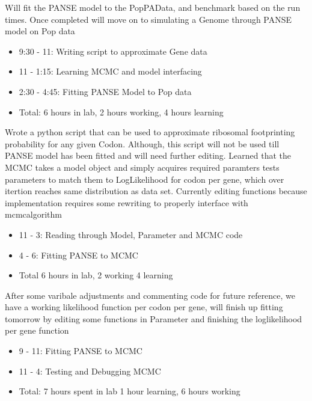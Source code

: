 \documentclass[12pt,hyperref]{labbook}
\begin{document}
Will fit the PANSE model to the PopPAData, and benchmark based on the run times. Once completed will move on to simulating a Genome through PANSE model on Pop data
\begin{itemize}
    \item 9:30 - 11: Writing script to approximate Gene data
    \item 11 - 1:15: Learning MCMC and model interfacing
    \item 2:30 - 4:45: Fitting PANSE Model to Pop data
    \item Total: 6 hours in lab, 2 hours working, 4 hours learning
\end{itemize}
Wrote a python script that can be used to approximate ribosomal footprinting probability for any given Codon. Although, this script will not be used till PANSE model has been fitted and will need further editing. 
Learned that the MCMC takes a model object and simply acquires required paramters tests parameters to match them to LogLikelihood for codon per gene, which over itertion reaches same distribution as data set.
Currently editing functions because implementation requires some rewriting to properly interface with mcmcalgorithm
\begin{itemize}
    \item 11 - 3: Reading through Model, Parameter and MCMC code
    \item 4 - 6: Fitting PANSE to MCMC
    \item Total 6 hours in lab, 2 working 4 learning
\end{itemize}
After some varibale adjustments and commenting code for future reference, we have a working likelihood function per codon per gene, will finish up fitting tomorrow by editing some functions in Parameter and finishing the loglikelihood per gene function
\begin{itemize}
    \item 9 - 11: Fitting PANSE to MCMC
    \item 11 - 4: Testing and Debugging MCMC
    \item Total: 7 hours spent in lab 1 hour learning, 6 hours working
\end{itemize}
\end{document}
